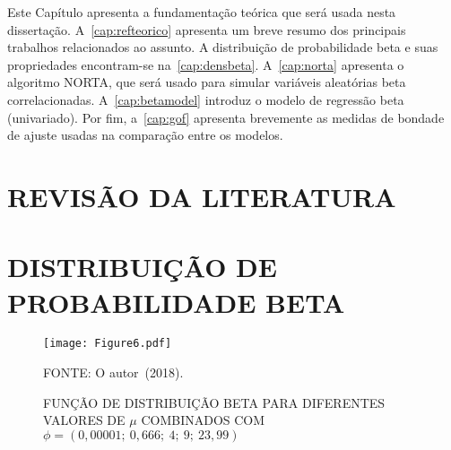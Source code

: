 
Este Capítulo apresenta a fundamentação teórica que será usada nesta
dissertação. A~\autoref{cap:refteorico} apresenta um breve resumo dos
principais trabalhos relacionados ao assunto. A distribuição de
probabilidade beta e suas propriedades encontram-se
na~\autoref{cap:densbeta}. A~\autoref{cap:norta} apresenta o algoritmo
NORTA, que será usado para simular variáveis aleatórias beta
correlacionadas. A~\autoref{cap:betamodel} introduz o modelo de
regressão beta (univariado). Por fim, a~\autoref{cap:gof} apresenta
brevemente as medidas de bondade de ajuste usadas na comparação entre os
modelos.

\section{REVISÃO DA LITERATURA}
\label{cap:refteorico}

\section{DISTRIBUIÇÃO DE PROBABILIDADE BETA}
\label{cap:densbeta}

\begin{figure}[!htb]
  \centering
  \vspace{0.35cm}
  \setlength{\abovecaptionskip}{.0001pt}
  \caption{FUNÇÃO DE DISTRIBUIÇÃO BETA PARA DIFERENTES VALORES DE $\mu$
    COMBINADOS COM $\phi = (0,00001;~0,666;~4;~9;~23,99)$}
  \texttt{[image: Figure6.pdf]}
  \begin{footnotesize}
    \vspace{-0.1cm}
    FONTE: O autor~(2018).
    \vspace{0.15cm}
  \end{footnotesize}
  \label{fig:dbeta}
\end{figure}

